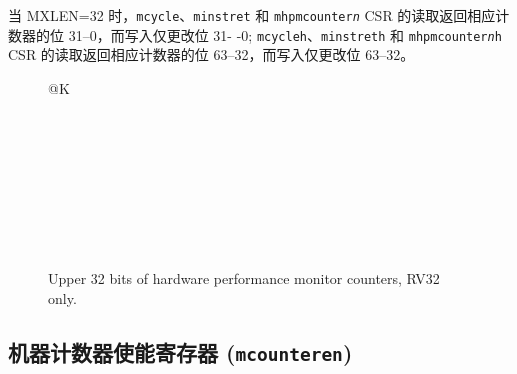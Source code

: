 当 MXLEN=32 时，{\tt mcycle}、{\tt minstret} 和 {\tt mhpmcounter{\em n}} CSR 的读取返回相应计数器的位 31--0，而写入仅更改位 31- -0; {\tt mcycleh}、{\tt minstreth} 和 {\tt mhpmcounter{\em n}h} CSR 的读取返回相应计数器的位 63--32，而写入仅更改位 63--32。

\begin{figure}[h!]
{\footnotesize
\begin{center}
\begin{tabular}{@{}K}
 \\ \hline
{} \\ \hline
{} \\ \hline
{} \\ \hline
{} \\ \hline
{}  \\ \hline
{} \\ \hline
{} \\  \\
\end{tabular}
\end{center}
}
\vspace{-0.1in}
\caption{Upper 32 bits of hardware performance monitor counters, RV32 only.}
\end{figure}


\subsection{机器计数器使能寄存器 ({\tt mcounteren})}
\label{sec:mcounteren}

